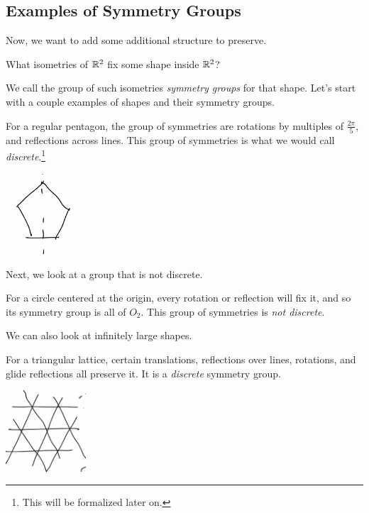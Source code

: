 \subsection{Examples of Symmetry Groups}
Now, we want to add some additional structure to preserve.

\begin{qq}
What isometries of $\mathbb R^2$ fix some shape inside $\mathbb R^2$?
\end{qq}

We call the group of such isometries \emph{symmetry groups} for that shape. Let's start with a couple examples of shapes and their symmetry groups. 
\begin{example}
For a regular pentagon, the group of symmetries are rotations by multiples of $\frac{2\pi}{5}$, and reflections across lines. This group of symmetries is what we would call \emph{discrete}.\footnote{This will be formalized later on.}
\begin{center}
    \includegraphics[width=3cm]{Lecture Files and Images/lec14-pentagon.png}
\end{center}
\end{example}
Next, we look at a group that is not discrete.
\begin{example}
For a circle centered at the origin, every rotation or reflection will fix it, and so its symmetry group is all of $O_2.$ This group of symmetries is \emph{not discrete}.
\end{example}
We can also look at infinitely large shapes. 
\begin{example}
For a triangular lattice, certain translations, reflections over lines, rotations, and glide reflections all preserve it. It is a \emph{discrete} symmetry group.
\begin{center}
    \includegraphics[width=3cm]{Lecture Files and Images/lec14-trianglelattice.png}%
\end{center}
\end{example}

